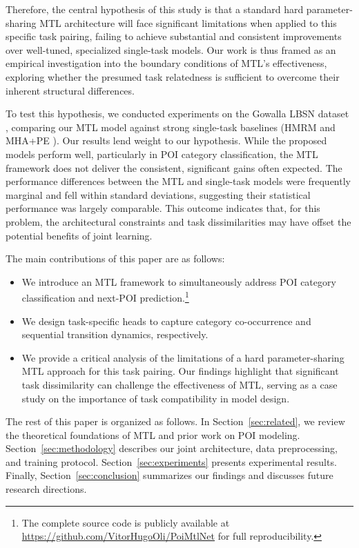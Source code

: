 Therefore, the central hypothesis of this study is that a standard hard parameter-sharing MTL architecture will face significant limitations when applied to this specific task pairing, failing to achieve substantial and consistent improvements over well-tuned, specialized single-task models. Our work is thus framed as an empirical investigation into the boundary conditions of MTL's effectiveness, exploring whether the presumed task relatedness is sufficient to overcome their inherent structural differences.

To test this hypothesis, we conducted experiments on the Gowalla LBSN dataset \cite{Cho2011, SNAP2014}, comparing our MTL model against strong single-task baselines (HMRM \cite{chen2020modeling} and MHA+PE \cite{zeng2019next}). Our results lend weight to our hypothesis. While the proposed models perform well, particularly in POI category classification, the MTL framework does not deliver the consistent, significant gains often expected. The performance differences between the MTL and single-task models were frequently marginal and fell within standard deviations, suggesting their statistical performance was largely comparable. This outcome indicates that, for this problem, the architectural constraints and task dissimilarities may have offset the potential benefits of joint learning.

The main contributions of this paper are as follows:
\begin{itemize}
    \item We introduce an MTL framework to simultaneously address POI category classification and next-POI prediction.\footnote{The complete source code is publicly available at \url{https://github.com/VitorHugoOli/PoiMtlNet} for full reproducibility.}
    \item We design task-specific heads to capture category co-occurrence and sequential transition dynamics, respectively.
    \item We provide a critical analysis of the limitations of a hard parameter-sharing MTL approach for this task pairing. Our findings highlight that significant task dissimilarity can challenge the effectiveness of MTL, serving as a case study on the importance of task compatibility in model design.
\end{itemize}

The rest of this paper is organized as follows. In Section~\ref{sec:related}, we review the theoretical foundations of MTL and prior work on POI modeling. Section~\ref{sec:methodology} describes our joint architecture, data preprocessing, and training protocol. Section~\ref{sec:experiments} presents experimental results. Finally, Section~\ref{sec:conclusion} summarizes our findings and discusses future research directions.